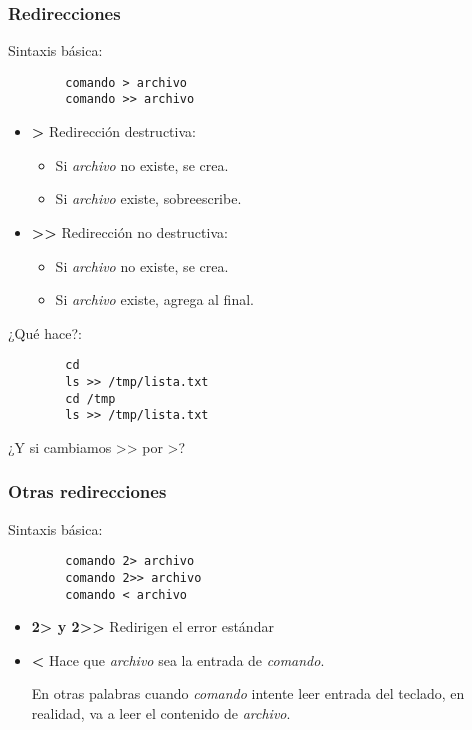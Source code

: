 \begin{frame}[fragile]
	\frametitle{Redirecciones}
	Sintaxis básica:
	\begin{lstlisting}
		comando > archivo
		comando >> archivo
	\end{lstlisting}
	\begin{itemize}
		\item \textbf{\textgreater} Redirección destructiva:
		\begin{itemize}
			\item Si \textit{archivo} no existe, se crea.
			\item Si \textit{archivo} existe, sobreescribe.
		\end{itemize}
		\item \textbf{\textgreater\textgreater} Redirección no destructiva:
		\begin{itemize}
			\item Si \textit{archivo} no existe, se crea.
			\item Si \textit{archivo} existe, agrega al final.
		\end{itemize}
	\end{itemize}
    \pause
	¿Qué hace?:
	\begin{lstlisting}
		cd
		ls >> /tmp/lista.txt
		cd /tmp
		ls >> /tmp/lista.txt
	\end{lstlisting}

	¿Y si cambiamos \textgreater\textgreater{} por \textgreater{}?
\end{frame}

\begin{frame}[fragile]
	\frametitle{Otras redirecciones}
	Sintaxis básica:
	\begin{lstlisting}
		comando 2> archivo
		comando 2>> archivo
		comando < archivo
	\end{lstlisting}
	\begin{itemize}
		\item \textbf{2\textgreater{} y 2\textgreater\textgreater} Redirigen el error estándar
		\item \textbf{\textless} Hace que \textit{archivo} sea la entrada de \textit{comando}.
		
		En otras palabras cuando \textit{comando} intente leer entrada del teclado, en realidad, va a leer el contenido de \textit{archivo}.
	\end{itemize}
\end{frame}


